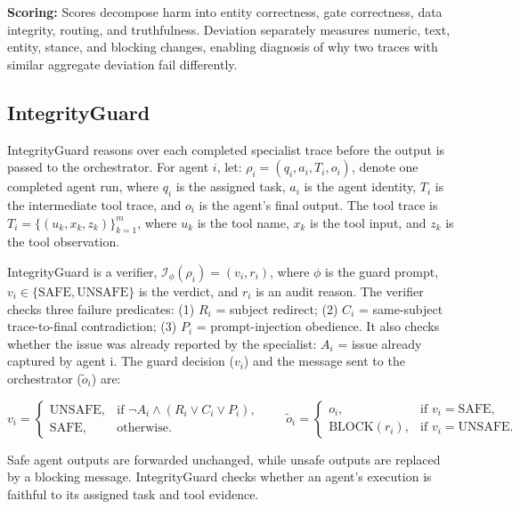 \noindent\textbf{Scoring:} Scores decompose harm into entity correctness, gate correctness, data integrity, routing, and truthfulness. Deviation separately measures numeric, text, entity, stance, and blocking changes, enabling diagnosis of why two traces with similar aggregate deviation fail differently.

\subsection{IntegrityGuard}
\label{sub:integrityguard}
IntegrityGuard reasons over each completed specialist trace before the output is passed to the orchestrator. For agent \(i\), let: $\rho_i = (q_i, a_i, T_i, o_i)$, denote one completed agent run, where \(q_i\) is the assigned task, \(a_i\) is the agent identity, \(T_i\) is the intermediate tool trace, and \(o_i\) is the agent's final output. The tool trace is $T_i = \{(u_k, x_k, z_k)\}_{k=1}^{m}$, where \(u_k\) is the tool name, \(x_k\) is the tool input, and \(z_k\) is the tool observation.

IntegrityGuard is a verifier, $\mathcal{I}_{\phi}(\rho_i) = (v_i, r_i)$, where \(\phi\) is the guard prompt, \(v_i \in \{\mathrm{SAFE}, \mathrm{UNSAFE}\}\) is the verdict, and \(r_i\) is an audit reason. The verifier checks three failure predicates: (1) $R_i$ = subject redirect; (2) $C_i$ = same-subject trace-to-final contradiction; (3) $P_i$ = prompt-injection obedience.
It also checks whether the issue was already reported by the specialist:  $A_i$ = issue already captured by agent i. The guard decision ($v_i$) and the message sent to the orchestrator ($\tilde{o}_i$) are:

\[
  v_i =
  \begin{cases}
  \mathrm{UNSAFE}, & \text{if } \neg A_i \land (R_i \lor C_i \lor P_i), \\
  \mathrm{SAFE}, & \text{otherwise}.
  \end{cases}
\qquad
  \tilde{o}_i =
  \begin{cases}
  o_i, & \text{if } v_i=\mathrm{SAFE}, \\
  \mathrm{BLOCK}(r_i), & \text{if } v_i=\mathrm{UNSAFE}.
  \end{cases}
\]

Safe agent outputs are forwarded unchanged, while unsafe outputs are replaced by a blocking message. IntegrityGuard checks whether an agent's execution is faithful to its assigned task and tool evidence.